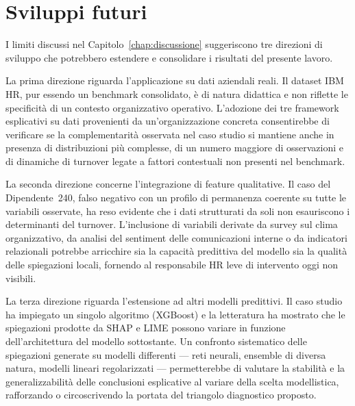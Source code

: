 \section{Sviluppi futuri}
\label{sec:sviluppi_futuri}

I limiti discussi nel Capitolo~\ref{chap:discussione} suggeriscono tre direzioni di sviluppo che potrebbero estendere e consolidare i risultati del presente lavoro.

La prima direzione riguarda l'applicazione su dati aziendali reali. Il dataset IBM HR, pur essendo un benchmark consolidato, è di natura didattica e non riflette le specificità di un contesto organizzativo operativo. L'adozione dei tre framework esplicativi su dati provenienti da un'organizzazione concreta consentirebbe di verificare se la complementarità osservata nel caso studio si mantiene anche in presenza di distribuzioni più complesse, di un numero maggiore di osservazioni e di dinamiche di turnover legate a fattori contestuali non presenti nel benchmark.

La seconda direzione concerne l'integrazione di feature qualitative. Il caso del Dipendente~240, falso negativo con un profilo di permanenza coerente su tutte le variabili osservate, ha reso evidente che i dati strutturati da soli non esauriscono i determinanti del turnover. L'inclusione di variabili derivate da survey sul clima organizzativo, da analisi del sentiment delle comunicazioni interne o da indicatori relazionali potrebbe arricchire sia la capacità predittiva del modello sia la qualità delle spiegazioni locali, fornendo al responsabile HR leve di intervento oggi non visibili.

La terza direzione riguarda l'estensione ad altri modelli predittivi. Il caso studio ha impiegato un singolo algoritmo (XGBoost) e la letteratura ha mostrato che le spiegazioni prodotte da SHAP e LIME possono variare in funzione dell'architettura del modello sottostante. Un confronto sistematico delle spiegazioni generate su modelli differenti --- reti neurali, ensemble di diversa natura, modelli lineari regolarizzati --- permetterebbe di valutare la stabilità e la generalizzabilità delle conclusioni esplicative al variare della scelta modellistica, rafforzando o circoscrivendo la portata del triangolo diagnostico proposto.
